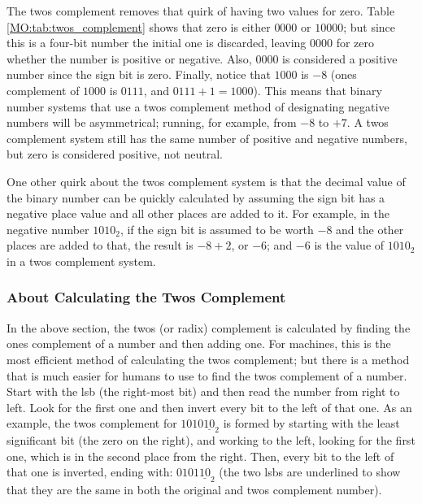 The twos complement removes that quirk of having two values for zero. Table \ref{MO:tab:twos_complement} shows that zero is either $ 0000 $ or $ 10000 $; but since this is a four-bit number the initial one is discarded, leaving $ 0000 $ for zero whether the number is positive or negative. Also, $ 0000 $ is considered a positive number since the sign bit is zero. Finally, notice that $ 1000 $ is $ -8 $ (ones complement of $ 1000 $ is $ 0111 $, and $ 0111 + 1 = 1000 $). This means that binary number systems that use a twos complement method of designating negative numbers will be asymmetrical; running, for example, from $ -8 $ to $ +7 $. A twos complement system still has the same number of positive and negative numbers, but zero is considered positive, not neutral.

 One other quirk about the twos complement system is that the decimal value of the binary number can be quickly calculated by assuming the sign bit has a negative place value and all other places are added to it. For example, in the negative number $ 1010_2 $, if the sign bit is assumed to be worth $ -8 $ and the other places are added to that, the result is $ -8+2 $, or $ -6 $; and $ -6 $ is the value of $ 1010_2 $ in a twos complement system.

\subsubsection{About Calculating the Twos Complement}
\label{MO:subsub:about_calculating_twos_complement}

In the above section, the twos (or radix) complement is calculated by finding the ones complement of a number and then adding one. For machines, this is the most efficient method of calculating the twos complement; but there is a method that is much easier for humans to use to find the twos complement of a number. Start with the \gls{lsb} (the right-most bit) and then read the number from right to left. Look for the first one and then invert every bit to the left of that one. As an example, the twos complement for $ 1010\underline{10}_2 $ is formed by starting with the least significant bit (the zero on the right), and working to the left, looking for the first one, which is in the second place from the right. Then, every bit to the left of that one is inverted, ending with: $ 0101\underline{10}_2 $ (the two \glspl{lsb} are underlined to show that they are the same in both the original and twos complement number).

